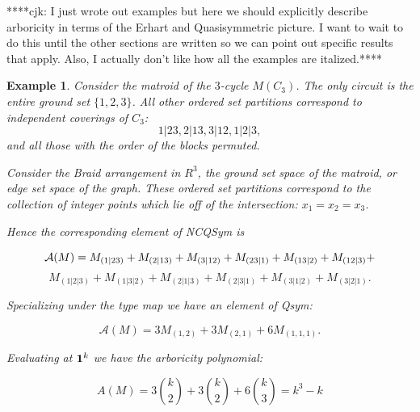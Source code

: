 \documentclass[12pt,reqno]{amsart}
\numberwithin{definition}{section}
\newtheorem{example}[definition]{Example}
\begin{document}



****cjk: I just wrote out examples but here we should explicitly describe arboricity in terms of the Erhart and Quasisymmetric picture.  I want to wait to do this until the other sections are written so we can point out specific results that apply.  Also, I actually don't like how all the examples are italized.****


\begin{example}

Consider the matroid of the $3$-cycle $M(C_3)$.  The only circuit is the entire ground set $\{1,2,3\}$.  All other ordered set partitions correspond to independent coverings of $C_3$: 
$$1|23, 2|13, 3|12, 1|2|3,$$
and all those with the order of the blocks permuted. 

Consider the Braid arrangement in $R^3$, the ground set space of the
matroid, or edge set space of the graph.  These ordered set partitions
correspond to the collection of integer points which lie off of the
intersection: $x_1 = x_2 = x_3$.


 Hence the corresponding element of NCQSym is 

$${\bf{{\mathcal A}}}(M) = M_{(1|23)} + M_{(2|13)} + M_{(3|12)} + M_{(23|1)} + M_{(13|2)} +  M_{(12|3)} + $$ $$ M_{(1|2|3)} + M_{(1|3|2)}
+ M_{(2|1|3)} + M_{(2|3|1)} + M_{(3|1|2)} + M_{(3|2|1)}. $$

\noindent Specializing under the type map we have an element of Qsym:

$${\mathcal A}(M) = 3 M_{(1,2)} + 3 M_{(2,1)} + 6 M_{(1,1,1)}. $$

\noindent Evaluating at ${\bf 1}^k $ we have the arboricity polynomial:

$$ A(M) = 3 { k \choose 2} + 3 { k \choose 2} + 6 { k \choose 3} = k^3 - k $$

\end{example}



 

 
\end{document}
